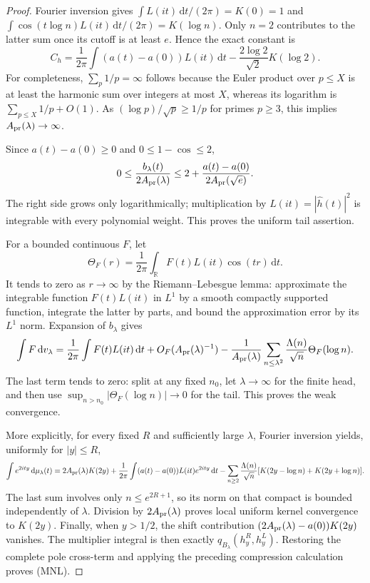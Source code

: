 \documentclass[11pt]{article}
\theoremstyle{remark}\newtheorem{remark}[theorem]{Remark}
\newcommand{\R}{\mathbb R}
\newcommand{\dd}{\,\mathrm d}
\begin{document}
\begin{proof}
Fourier inversion gives $\int L(it)\dd t/(2\pi)=K(0)=1$
and $\int\cos(t\log n)L(it)\dd t/(2\pi)=K(\log n)$.
Only $n=2$ contributes to the latter sum once its cutoff
is at least $e$. Hence the exact constant is
\[
 C_h=\frac1{2\pi}\int(a(t)-a(0))L(it)\dd t
                       -\frac{2\log2}{\sqrt2}K(\log2).
\]
For completeness, $\sum_p1/p=\infty$ follows because the
Euler product over $p\le X$ is at least the harmonic sum
over integers at most $X$, whereas its logarithm is
$\sum_{p\le X}1/p+O(1)$.
As $(\log p)/\sqrt p\ge1/p$ for primes $p\ge3$, this implies
$A_{\rm pr}(\lambda)\to\infty$.

Since $a(t)-a(0)\ge0$ and $0\le1-\cos\le2$,
\[
 0\le\frac{b_\lambda(t)}{2A_{\rm pr}(\lambda)}
 \le2+\frac{a(t)-a(0)}{2A_{\rm pr}(\sqrt e)}.
\]
The right side grows only logarithmically; multiplication
by $L(it)=|\widehat h(t)|^2$ is integrable with every
polynomial weight. This proves the uniform tail assertion.

For a bounded continuous $F$, let
\[
 \Theta_F(r)=\frac1{2\pi}\int_\R F(t)L(it)\cos(tr)\dd t.
\]
It tends to zero as $r\to\infty$ by the Riemann--Lebesgue
lemma: approximate the integrable function $F(t)L(it)$ in
$L^1$ by a smooth compactly supported function, integrate
the latter by parts, and bound the approximation error by
its $L^1$ norm. Expansion of $b_\lambda$ gives
\[
 \int F\dd v_\lambda
 =\frac1{2\pi}\int F(t)L(it)\dd t+O_F(A_{\rm pr}(\lambda)^{-1})
 -\frac1{A_{\rm pr}(\lambda)}
     \sum_{n\le\lambda^2}\frac{\Lambda(n)}{\sqrt n}
                                  \Theta_F(\log n).
\]
The last term tends to zero: split at any fixed $n_0$,
let $\lambda\to\infty$ for the finite head, and then use
$\sup_{n>n_0}|\Theta_F(\log n)|\to0$ for the tail.
This proves the weak convergence.

More explicitly, for every fixed $R$ and sufficiently large
$\lambda$, Fourier inversion yields, uniformly for $|y|\le R$,
\[
 \int e^{2ity}\dd\mu_\lambda(t)
 =2A_{\rm pr}(\lambda)K(2y)
   +\frac1{2\pi}\int(a(t)-a(0))L(it)e^{2ity}\dd t
   -\sum_{n\ge2}\frac{\Lambda(n)}{\sqrt n}
                  [K(2y-\log n)+K(2y+\log n)] .
\]
The last sum involves only $n\le e^{2R+1}$, so its norm
on that compact is bounded independently of $\lambda$.
Division by $2A_{\rm pr}(\lambda)$ proves local uniform
kernel convergence to $K(2y)$.
Finally, when $y>1/2$, the shift contribution
$(2A_{\rm pr}(\lambda)-a(0))K(2y)$ vanishes.
The multiplier integral is then exactly
$q_{B_\lambda}(h_y^R,h_y^L)$.
Restoring the complete pole cross-term and applying the
preceding compression calculation proves (MNL).
\end{proof}
\end{document}
